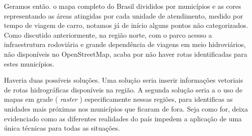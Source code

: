 \documentclass[]{article}
\begin{document}
Geramos então. o mapa completo do Brasil divididos por municípios e as
cores representando as áreas atingidas por cada unidade de atendimento,
medido por tempo de viagem de carro, notamos já de início alguns pontos
não categorizados. Como discutido anteriormente, na região norte, com o
parco acesso a infraestrutura rodoviária e grande dependência de viagens
em meio hidroviários, não disponíveis no OpenStreetMap, acaba por não
haver rotas identificadas para estes municípios.

Haveria duas possíveis soluções. Uma solução seria inserir informações
vetoriais de rotas hidrográficas disponíveis na região. A segunda
solução seria a o uso de mapas em grade ( \emph{raster} )
especificamente nessas regiões, para identificas as unidades mais
próximas nos municípios que ficaram de fora. Seja como for, deixa
evidenciado como as diferentes realidades do país impedem a aplicação de
uma única técnicas para todas as situações.
\end{document}
